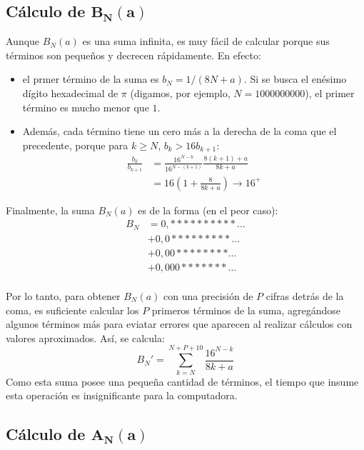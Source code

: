 \subsection{Cálculo de $\boldsymbol{B_{N}(a)}$}

Aunque $B_{N}(a)$ es una suma infinita, es muy fácil de calcular
porque sus términos son pequeños y decrecen rápidamente. En efecto:
\begin{itemize}
\item el prmer término de la suma es $b_{N}=1/(8N+a)$. Si se busca
  el enésimo dígito hexadecimal de $\pi$ (digamos, por ejemplo,
  $N=1000000000$), el primer término es mucho menor que $1$.
\item Además, cada término tiene un cero más a la derecha de la coma
  que el precedente, porque para $k\geq N$, $b_{k}>16b_{k+1}$:
  \begin{align*}
    \frac{b_{k}}{b_{k+1}}&=\frac{16^{N-k}}{16^{N-(k+1)}}\frac{8(k+1)+a}{8k+a}\\
                         &=16\left(1+\frac{8}{8k+a}\right) \longrightarrow 16^{+}
  \end{align*}
\end{itemize}

Finalmente, la suma $B_{N}(a)$ es de la forma (en el peor caso):
\begin{align*}
  B_{N}&=0,**********\ldots\\
       &+0,0*********\ldots\\
       &+0,00********\ldots\\
       &+0,000*******\ldots\\ 
\end{align*}

Por lo tanto, para obtener $B_{N}(a)$ con una precisión de $P$ cifras
detrás de la coma, es suficiente calcular los $P$ primeros términos de
la suma, agregándose algunos términos más para eviatar errores que
aparecen al realizar cálculos con valores aproximados. Así, se
calcula:
\begin{equation*}
  B_{N}'=\sum_{k=N}^{N+P+10}\frac{16^{N-k}}{8k+a} 
\end{equation*}
Como esta suma posee una pequeña cantidad de términos, el tiempo que
insume esta operación es insignificante para la computadora.

\subsection{Cálculo de $\boldsymbol{A_{N}(a)}$}

